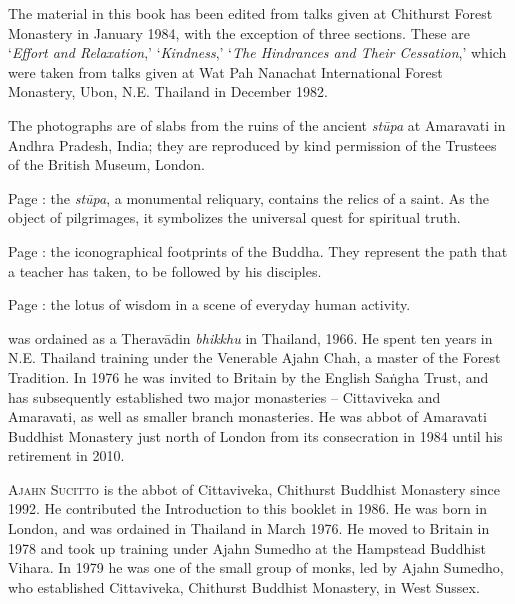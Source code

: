 
{\centering\par
\Large\scshape\chapTitleFont\thetitle
\par}
\vspace*{2\baselineskip}

{%
\setlength{\parskip}{1.5em}
\setlength{\parindent}{0pt}

The material in this book has been edited from talks given at Chithurst Forest Monastery in January 1984, with the exception of three sections. These are `\textit{Effort and Relaxation},' `\textit{Kindness},' `\textit{The Hindrances and Their Cessation},' which were taken from talks given at Wat Pah Nanachat International Forest Monastery, Ubon, N.E. Thailand in December 1982.

The photographs are of slabs from the ruins of the ancient \textit{st\=upa} at Amaravati in Andhra Pradesh, India; they are reproduced by kind permission of the Trustees of the British Museum, London.

Page \pageref{image-stupa}: the \textit{st\=upa}, a monumental reliquary, contains the relics of a saint. As the object of pilgrimages, it symbolizes the universal quest for spiritual truth.

Page \pageref{image-feet}: the iconographical footprints of the Buddha. They represent the path that a teacher has taken, to be followed by his disciples.

Page \pageref{image-lotus-scene}: the lotus of wisdom in a scene of everyday human activity.

\clearpage
\thispagestyle{empty}

{\scshape \theauthor} was ordained as a Therav\=adin \textit{bhikkhu} in Thailand, 1966. He spent ten years in N.E. Thailand training under the Venerable Ajahn Chah, a master of the Forest Tradition. In 1976 he was invited to Britain by the English Sa\.ngha Trust, and has subsequently established two major monasteries -- Cittaviveka and Amaravati, as well as smaller branch monasteries. He was abbot of Amaravati Buddhist Monastery just north of London from its consecration in 1984 until his retirement in 2010.

{\scshape Ajahn Sucitto} is the abbot of Cittaviveka, Chithurst Buddhist Monastery since 1992. He contributed the Introduction to this booklet in 1986. He was born in London, and was ordained in Thailand in March 1976. He moved to Britain in 1978 and took up training under Ajahn Sumedho at the Hampstead Buddhist Vihara. In 1979 he was one of the small group of monks, led by Ajahn Sumedho, who established Cittaviveka, Chithurst Buddhist Monastery, in West Sussex.


}

